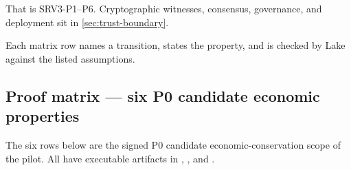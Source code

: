 \noindent That is SRV3-P1--P6. Cryptographic witnesses, consensus, governance,
and deployment sit in \cref{sec:trust-boundary}.

Each matrix row names a transition, states the property, and is checked by
Lake against the listed assumptions.

\subsection*{Proof matrix --- six P0 candidate economic properties}

\noindent The six rows below are the signed P0 candidate economic-conservation
scope of the pilot. All have executable artifacts in ,
, and .

\noindent
\begingroup
\footnotesize
\renewcommand{\arraystretch}{1.06}
